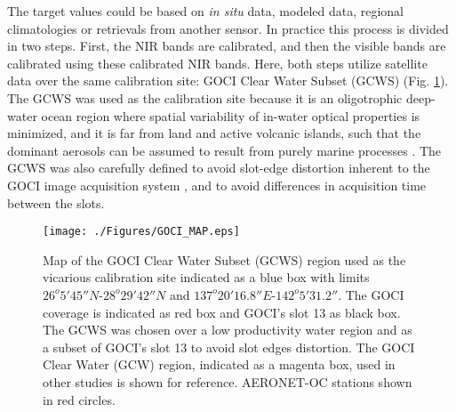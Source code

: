 \documentclass[]{interact}
\theoremstyle{plain}%
\theoremstyle{definition}
\theoremstyle{remark}
\begin{document}
The target values could be based on {\it in situ } data, modeled data, regional climatologies or retrievals from another sensor. In practice this process is divided in two steps. First, the NIR bands are calibrated, and then the visible bands are calibrated using these calibrated NIR bands.  Here, both steps utilize satellite data over the same calibration site: GOCI Clear Water Subset (GCWS) (Fig. \ref{fig:GOCI_map}). The GCWS was used as the calibration site because it is an oligotrophic deep-water ocean region where spatial variability of in-water optical properties is minimized, and it is far from land and active volcanic islands, such that the dominant aerosols can be assumed to result from purely marine processes \citep{Franz:07}. The GCWS was also carefully defined to avoid slot-edge distortion inherent to the GOCI image acquisition system \citep{Kim:2015,Kim:2016}, and to avoid differences in acquisition time between the slots. 
\begin{figure}[H]
  \centering
  \texttt{[image: ./Figures/GOCI\_MAP.eps]}
    \caption{Map of the GOCI Clear Water Subset (GCWS) region used as the vicarious calibration site indicated as a blue box with limits $26^o 5' 45''N$-$28^o 29' 42''N$ and $137^o 20' 16.8''E$-$142^o 5' 31.2''$. The GOCI coverage is indicated as red box and GOCI's slot 13 as black box. The GCWS was chosen over a low productivity water region and as a subset of GOCI's slot 13 to avoid slot edges distortion. The GOCI Clear Water (GCW) region, indicated as a magenta box, used in other studies is shown for reference. AERONET-OC stations shown in red circles. \label{fig:GOCI_map}} 
\end{figure}



\end{document}
